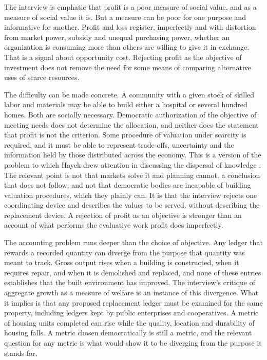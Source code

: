 \documentclass[12pt]{article}
\theoremstyle{definition}
\begin{document}
The interview is emphatic that profit is a poor measure of social value, and as a measure of social value it is. But a measure can be poor for one purpose and informative for another. Profit and loss register, imperfectly and with distortion from market power, subsidy and unequal purchasing power, whether an organization is consuming more than others are willing to give it in exchange. That is a signal about opportunity cost. Rejecting profit as the objective of investment does not remove the need for some means of comparing alternative uses of scarce resources.

The difficulty can be made concrete. A community with a given stock of skilled labor and materials may be able to build either a hospital or several hundred homes. Both are socially necessary. Democratic authorization of the objective of meeting needs does not determine the allocation, and neither does the statement that profit is not the criterion. Some procedure of valuation under scarcity is required, and it must be able to represent trade-offs, uncertainty and the information held by those distributed across the economy. This is a version of the problem to which Hayek drew attention in discussing the dispersal of knowledge \cite{hayek1945}. The relevant point is not that markets solve it and planning cannot, a conclusion that does not follow, and not that democratic bodies are incapable of building valuation procedures, which they plainly can. It is that the interview rejects one coordinating device and describes the values to be served, without describing the replacement device. A rejection of profit as an objective is stronger than an account of what performs the evaluative work profit does imperfectly.

The accounting problem runs deeper than the choice of objective. Any ledger that rewards a recorded quantity can diverge from the purpose that quantity was meant to track. Gross output rises when a building is constructed, when it requires repair, and when it is demolished and replaced, and none of these entries establishes that the built environment has improved. The interview's critique of aggregate growth as a measure of welfare is an instance of this divergence. What it implies is that any proposed replacement ledger must be examined for the same property, including ledgers kept by public enterprises and cooperatives. A metric of housing units completed can rise while the quality, location and durability of housing falls. A metric chosen democratically is still a metric, and the relevant question for any metric is what would show it to be diverging from the purpose it stands for.
\end{document}
